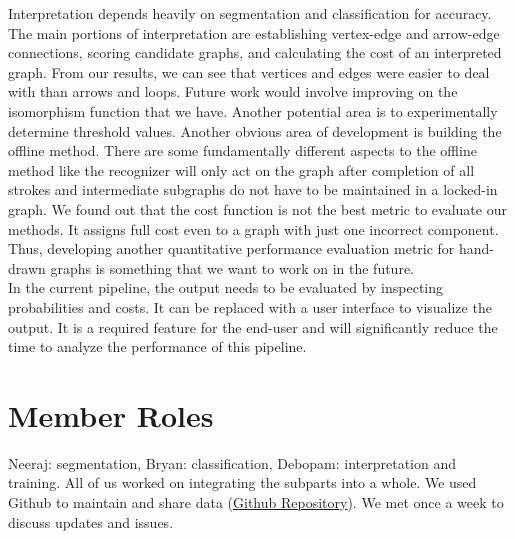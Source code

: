 \documentclass[10pt, twocolumn,letterpaper]{article}
\begin{document}
  Interpretation depends heavily on segmentation and classification for accuracy. The main portions of interpretation are establishing vertex-edge and arrow-edge connections, scoring candidate graphs, and calculating the cost of an interpreted graph. From our results, we can see that vertices and edges were easier to deal with than arrows and loops. Future work would involve improving on the isomorphism function that we have. Another potential area is to experimentally determine threshold values. Another obvious area of development is building the offline method. There are some fundamentally different aspects to the offline method like the recognizer will only act on the graph after completion of all strokes and intermediate subgraphs do not have to be maintained in a locked-in graph. We found out that the cost function is not the best metric to evaluate our methods. It assigns full cost even to a graph with just one incorrect component. Thus, developing another quantitative performance evaluation metric for hand-drawn graphs is something that we want to work on in the future.\\
    
  In the current pipeline, the output needs to be evaluated by inspecting probabilities and costs.  It can be replaced with a user interface to visualize the output. It is a required feature for the end-user and will significantly reduce the time to analyze the performance of this pipeline.
	
	\section{Member Roles}
	Neeraj: segmentation, Bryan: classification, Debopam: interpretation and training. All of us worked on integrating the subparts into a whole. We used Github to maintain and share data (\href{https://github.com/neerajgangwar/graph-recognition}{Github Repository}). We met once a week to discuss updates and issues.
	
	\printbibliography[title=References]
	
\end{document}
